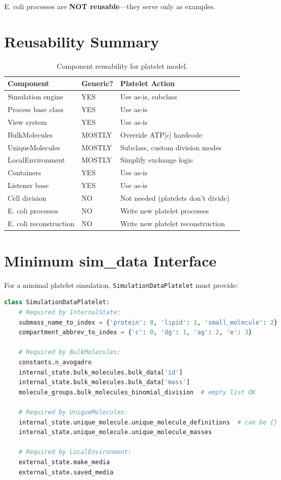 \documentclass[11pt,a4paper]{report}
\begin{document}
E. coli processes are \textbf{NOT reusable}---they serve only as examples.

\section{Reusability Summary}

\begin{table}[h]
\centering
\small
\begin{tabular}{llll}
\toprule
\textbf{Component} & \textbf{Generic?} & \textbf{Platelet Action} \\
\midrule
Simulation engine & YES & Use as-is, subclass \\
Process base class & YES & Use as-is \\
View system & YES & Use as-is \\
BulkMolecules & MOSTLY & Override ATP[c] hardcode \\
UniqueMolecules & MOSTLY & Subclass, custom division modes \\
LocalEnvironment & MOSTLY & Simplify exchange logic \\
Containers & YES & Use as-is \\
Listener base & YES & Use as-is \\
Cell division & NO & Not needed (platelets don't divide) \\
E. coli processes & NO & Write new platelet processes \\
E. coli reconstruction & NO & Write new platelet reconstruction \\
\bottomrule
\end{tabular}
\caption{Component reusability for platelet model.}
\end{table}

\section{Minimum sim\_data Interface}

For a minimal platelet simulation, \texttt{SimulationDataPlatelet} must provide:

\begin{lstlisting}[language=Python]
class SimulationDataPlatelet:
    # Required by InternalState:
    submass_name_to_index = {'protein': 0, 'lipid': 1, 'small_molecule': 2}
    compartment_abbrev_to_index = {'c': 0, 'dg': 1, 'ag': 2, 'e': 3}
    
    # Required by BulkMolecules:
    constants.n_avogadro
    internal_state.bulk_molecules.bulk_data['id']
    internal_state.bulk_molecules.bulk_data['mass']
    molecule_groups.bulk_molecules_binomial_division  # empty list OK
    
    # Required by UniqueMolecules:
    internal_state.unique_molecule.unique_molecule_definitions  # can be {}
    internal_state.unique_molecule.unique_molecule_masses
    
    # Required by LocalEnvironment:
    external_state.make_media
    external_state.saved_media
\end{lstlisting}
\end{document}
